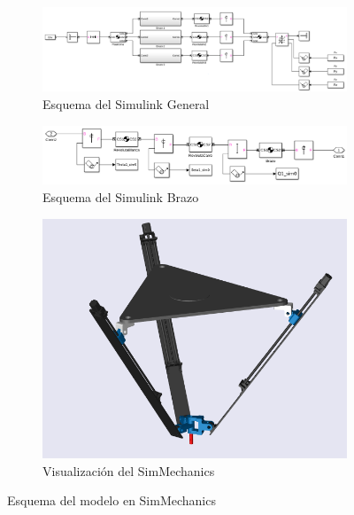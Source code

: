 \begin{figure}[hb!]
    \centering
    \begin{subfigure}{0.9\textwidth}
        \includegraphics[width = \linewidth]{Cap4_DisenoBasico/Figura/ComparativoSimMechanics/EsquemaSimMechanicsGeneral.png}
        \caption{Esquema del Simulink General}
    \end{subfigure}
    \begin{subfigure}{0.9\textwidth}
        \includegraphics[width = \linewidth]{Cap4_DisenoBasico/Figura/ComparativoSimMechanics/EsquemaSimMechanicsArm.png}
        \caption{Esquema del Simulink Brazo}
    \end{subfigure}
    \begin{subfigure}{0.6\textwidth}
        \includegraphics[width = \linewidth]{Cap4_DisenoBasico/Figura/ComparativoSimMechanics/ModelosSimMechanicsSolid.PNG}
        \caption{Visualización del SimMechanics}
    \end{subfigure}
    \caption{Esquema del modelo en SimMechanics}
\end{figure}

